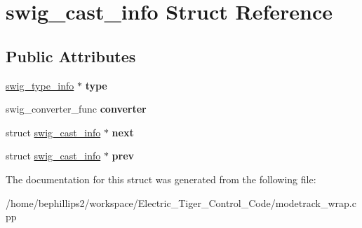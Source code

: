 \hypertarget{structswig__cast__info}{\section{swig\-\_\-cast\-\_\-info Struct Reference}
\label{structswig__cast__info}
}
\subsection*{Public Attributes}
\begin{DoxyCompactItemize}
\item 
\hypertarget{structswig__cast__info_a1c9023a301c8d6806209f4e10df6e9e0}{\hyperlink{structswig__type__info}{swig\-\_\-type\-\_\-info} $\ast$ {\bfseries type}}\label{structswig__cast__info_a1c9023a301c8d6806209f4e10df6e9e0}

\item 
\hypertarget{structswig__cast__info_aa630fddfbb1bf9c97a03f9479ba32f76}{swig\-\_\-converter\-\_\-func {\bfseries converter}}\label{structswig__cast__info_aa630fddfbb1bf9c97a03f9479ba32f76}

\item 
\hypertarget{structswig__cast__info_ae79c6fa058a9d908bbdac14db0c9db5e}{struct \hyperlink{structswig__cast__info}{swig\-\_\-cast\-\_\-info} $\ast$ {\bfseries next}}\label{structswig__cast__info_ae79c6fa058a9d908bbdac14db0c9db5e}

\item 
\hypertarget{structswig__cast__info_afc685bcf38a5a06c6601775138c5999c}{struct \hyperlink{structswig__cast__info}{swig\-\_\-cast\-\_\-info} $\ast$ {\bfseries prev}}\label{structswig__cast__info_afc685bcf38a5a06c6601775138c5999c}

\end{DoxyCompactItemize}


The documentation for this struct was generated from the following file\-:\begin{DoxyCompactItemize}
\item 
/home/bephillips2/workspace/\-Electric\-\_\-\-Tiger\-\_\-\-Control\-\_\-\-Code/modetrack\-\_\-wrap.\-cpp\end{DoxyCompactItemize}
